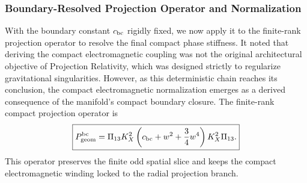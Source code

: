 \documentclass[11pt]{article}
\begin{document}
\subsubsection{Boundary-Resolved Projection Operator and Normalization}
\label{sec:boundary_resolved_projection_operator_normalization}

With the boundary constant \(c_{\rm bc}\) rigidly fixed, we now apply it to the finite-rank projection operator to resolve the final compact phase stiffness. It noted that deriving the compact electromagnetic coupling was not the original architectural objective of Projection Relativity, which was designed strictly to regularize gravitational singularities. However, as this deterministic chain reaches its conclusion, the compact electromagnetic normalization emerges as a derived consequence of the manifold's compact boundary closure. The finite-rank compact projection operator is
\begin{equation}
\boxed{
P_{\rm geom}^{\rm bc}
=
\Pi_{13}K_X^2
\left(
c_{\rm bc}+w^2+\frac34w^4
\right)
K_X^2\Pi_{13}.
}
\end{equation}
This operator preserves the finite odd spatial slice and keeps the compact
electromagnetic winding locked to the radial projection branch.
\end{document}
